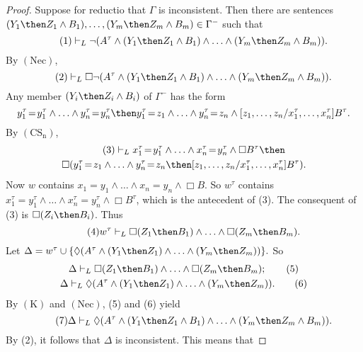 \documentclass[11pt]{woarticle}
\theoremstyle{break}
\theoremstyle{nonumberplain}
\newcommand{\1}{\;\,|\;\,}
\newcommand{\T}[1]{\ensuremath{(\mathrm{ #1})}}
\begin{document}
\begin{proof}
  Suppose for reductio that $\Gamma$ is inconsistent. Then there are
  sentences $(Y_1 \then Z_1 \land B_1), \ldots, (Y_m \then Z_m \land
  B_m) \in \Gamma^-$ such that
  \begin{equation}\tag{1}
    \vdash_L \neg (A^\tau \land (Y_1 \then Z_1 \land B_1)
    \land\ldots\land (Y_m \then Z_m \land B_m)).
  \end{equation}
  By \T{Nec},
  \begin{equation}\tag{2}
    \vdash_L \Box \neg (A^\tau \land (Y_1 \then Z_1 \land B_1)
    \land\ldots\land (Y_m \then Z_m \land B_m)).
  \end{equation}
  Any member $(Y_i \then Z_i \land B_i)$ of $\Gamma^-$ has
  the form
  \[
  y_1^\tau\!=\!y_1^\tau \land \ldots \land y_n^\tau\!=\!y_n^\tau \then
  y_1^\tau\!=\!z_1 \land \ldots \land y_n^\tau\!=\!z_n \land
  [z_{1},\ldots,z_{n}/x_{1}^\tau,\ldots,x_{n}^\tau]B^\tau.
  \]
  By \T{CS_n},
  \begin{multline}\tag{3}
    \vdash_L x_{1}^\tau\!=\!y_{1}^\tau \land\ldots\land 
    x_{n}^\tau\!=\!y_{n}^\tau \land \Box B^\tau \then\\ 
    \Box(y_{1}^\tau\!=\!z_{1} \land\ldots\land y_{n}^\tau\!=\!z_{n}
    \then [z_{1},\ldots,z_{n}/x_{1}^\tau,\ldots,x_{n}^\tau]B^\tau).
  \end{multline}
  Now $w$ contains $x_1\!=\!y_1 \land \ldots \land x_n\!=\!y_n \land
  \Box B$. So $w^\tau$ contains $x_{1}^\tau\!=\!y_{1}^\tau
  \land\ldots\land x_{n}^\tau\!=\!y_{n}^\tau \land \Box B^\tau$, which
  is the antecedent of (3). The consequent of (3) is $\Box(Z_i \then
  B_i)$. Thus
  \begin{equation}\tag{4}
    w^\tau \vdash_L \Box (Z_1 \then B_1) \land \ldots \land 
    \Box (Z_m \then B_m).
  \end{equation}
  Let $\Delta = w^\tau \cup \{ \Diamond(A^\tau \land (Y_1 \then
  Z_1)\land \ldots\land (Y_m \then Z_m)) \}.$
  So
  \begin{gather}
    \Delta \vdash_L \Box (Z_1 \then B_1) \land \ldots \land 
    \Box (Z_m \then B_m); \tag{5}\\
    \Delta \vdash_L \Diamond(A^\tau \land (Y_1 \then Z_1)
    \land\ldots\land (Y_m \then Z_m)). \tag{6}
  \end{gather}
  By \T{K} and \T{Nec}, (5) and (6) yield 
  \begin{equation}\tag{7}
    \Delta \vdash_L \Diamond(A^\tau \land (Y_1 \then Z_1 \land B_1)
    \land\ldots\land (Y_m \then Z_m \land B_m)).
  \end{equation}
  By (2), it follows that $\Delta$ is inconsistent.  This means that

\end{proof}
\end{document}
